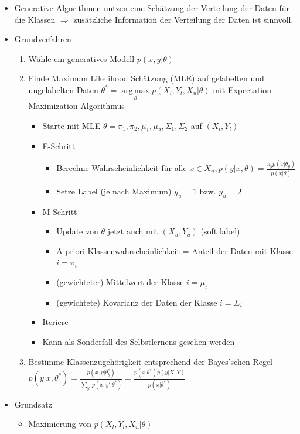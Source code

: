 \documentclass[paper=a4, fontsize=11pt]{scrartcl} %
\numberwithin{equation}{section} %
\numberwithin{figure}{section} %
\numberwithin{table}{section} %
\DeclareMathOperator*{\argmax}{arg\,max}
\begin{document}
\begin{itemize}
\item Generative Algorithmen nutzen eine Schätzung der Verteilung der Daten für die Klassen $\Rightarrow$ zusätzliche Information der Verteilung der Daten ist sinnvoll.
\item Grundverfahren
\begin{enumerate}
\item Wähle ein generatives Modell $p(x,y|\theta)$
\item Finde Maximum Likelihood Schätzung (MLE) auf gelabelten und ungelabelten Daten $\theta^* = \argmax\limits_{\theta} p(X_l, Y_l, X_u | \theta)$ mit Expectation Maximization Algorithmus
\begin{itemize}
\item Starte mit MLE $\theta = {\pi_1, \pi_2, \mu_1, \mu_2, \Sigma_1, \Sigma_2}$ auf $(X_l,Y_l)$
\item E-Schritt
\begin{itemize}
\item Berechne Wahrscheinlichkeit für alle $x \in X_u, p(y|x,\theta) = \frac{\pi_y p(x|\theta_y)}{p(x|\theta)}$
\item Setze Label (je nach Maximum) $y_u = 1$ bzw. $y_u = 2$
\end{itemize}
\item M-Schritt
\begin{itemize}
\item Update von $\theta$ jetzt auch mit $(X_u,Y_u)$ (soft label)
\item A-priori-Klassenwahrscheinlichkeit = Anteil der Daten mit Klasse $i = \pi_i$
\item (gewichteter) Mittelwert der Klasse $i = \mu_i$
\item (gewichtete) Kovarianz der Daten der Klasse $i = \Sigma_i$
\end{itemize}
\item Iteriere
\item Kann als Sonderfall des Selbstlernens gesehen werden
\end{itemize}
\item Bestimme Klassenzugehörigkeit entsprechend der Bayes'schen Regel\\ $p(y|x,\theta^*) = \frac{p(x,y|\theta_y^*)}{\sum\limits_{y'}p(x,y'|\theta^*)} = \frac{p(x|\theta^*) p(y|X,Y)}{p(x|\theta^*)}$
\end{enumerate}
\item Grundsatz
\begin{itemize}
\item Maximierung von $p(X_l,Y_l,X_u|\theta)$

\end{itemize}
\end{itemize}
\end{document}
